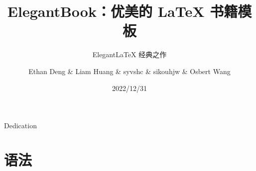 \documentclass[lang=cn,newtx,10pt,scheme=chinese,color=black]{elegantbook}
\title{ElegantBook：优美的 \LaTeX{} 书籍模板}
\subtitle{Elegant\LaTeX{} 经典之作}
\author{Ethan Deng \& Liam Huang \& syvshc \& sikouhjw \& Osbert Wang}
\institute{Elegant\LaTeX{} Program}
\date{2022/12/31}
\begin{document}
\maketitle
\frontmatter
\clearpage
\begin{center}
  \thispagestyle{empty}
  \vspace*{\fill}
  \Large Dedication
  \vspace*{\fill}
\end{center}
\clearpage
\tableofcontents
\mainmatter
% 
\part{语法}
% 


% 
% 
% 
% 
% 
% 
% 
% 
\printindex
\printbibliography[heading=bibintoc, title=\ebibname]
\end{document}
